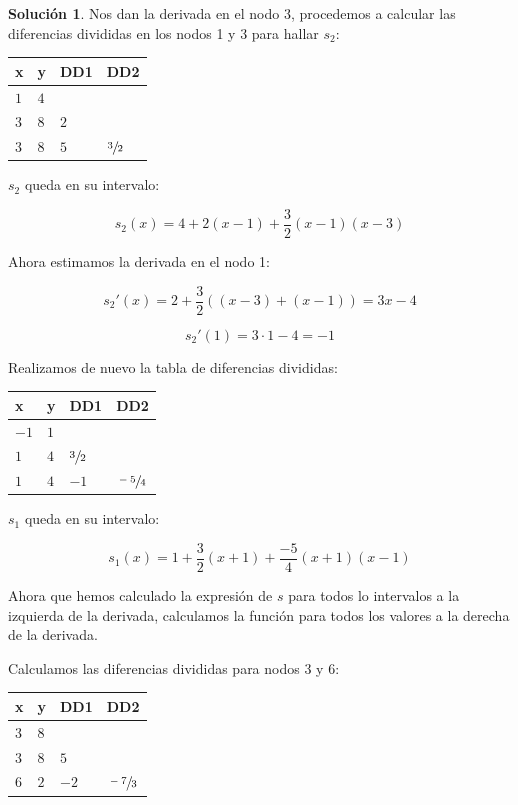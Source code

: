 \documentclass[11pt,spanish,]{article}
\theoremstyle{definition} \newtheorem*{definicion}{Definición}
\newtheorem*{solucion}{Solución}
\begin{document}
\begin{solucion}
Nos dan la derivada en el nodo 3, procedemos a calcular las diferencias divididas en los nodos 1 y 3 para hallar $s_2$:


\begin{table}[h]
\centering
\begin{tabular}{llll}
x & y & DD1 & DD2\\
\hline
$1$ & $4$ &     & \\
$3$ & $8$ & $2$ & \\
$3$ & $8$ & $5$ & $\sfrac{3}{2}$ \\
\hline
\end{tabular}
\end{table}

$s_2$ queda en su intervalo:

$$s_2(x)=4+2(x-1)+\frac{3}{2}(x-1)(x-3)$$

Ahora estimamos la derivada en el nodo 1:

$$s_2'(x)=2+\frac{3}{2}((x-3)+(x-1))=3x - 4$$

$$s_2'(1)= 3 \cdot 1 - 4 = -1$$

Realizamos de nuevo la tabla de diferencias divididas:

\begin{table}[h]
\centering
\begin{tabular}{llll}
x & y & DD1 & DD2\\
\hline
$-1$ & $1$  &                & \\
$1$  & $4$  & $\sfrac{3}{2}$  & \\
$1$  & $4$  & $-1$           & $\sfrac{-5}{4}$ \\
\hline
\end{tabular}
\end{table}

$s_1$ queda en su intervalo:

$$s_1(x)=1+\frac{3}{2}(x+1)+\frac{-5}{4}(x+1)(x-1)$$

Ahora que hemos calculado la expresión de $s$ para todos lo intervalos a la izquierda de la derivada, calculamos la función para todos los valores a la derecha de la
derivada.

Calculamos las diferencias divididas para nodos 3 y 6:

\begin{table}[h]
\centering
\begin{tabular}{llll}
x & y & DD1 & DD2\\
\hline
$3$  & $8$  &      & \\
$3$  & $8$  & $5$  & \\
$6$  & $2$  & $-2$ & $\sfrac{-7}{3}$ \\
\hline
\end{tabular}
\end{table}





\end{solucion}
\end{document}
